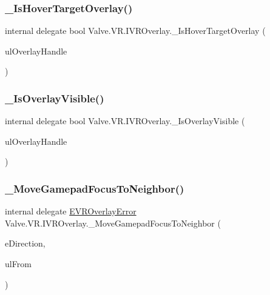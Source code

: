 \subsubsection{\texorpdfstring{\_IsHoverTargetOverlay()}{\_IsHoverTargetOverlay()}}
{\footnotesize\ttfamily internal delegate bool Valve.\+V\+R.\+I\+V\+R\+Overlay.\+\_\+\+Is\+Hover\+Target\+Overlay (\begin{DoxyParamCaption}\item[{ulong}]{ul\+Overlay\+Handle }\end{DoxyParamCaption})}

\mbox{\label{struct_valve_1_1_v_r_1_1_i_v_r_overlay_afc7823ac1ca911ba5de47113a72d3930}} 
\subsubsection{\texorpdfstring{\_IsOverlayVisible()}{\_IsOverlayVisible()}}
{\footnotesize\ttfamily internal delegate bool Valve.\+V\+R.\+I\+V\+R\+Overlay.\+\_\+\+Is\+Overlay\+Visible (\begin{DoxyParamCaption}\item[{ulong}]{ul\+Overlay\+Handle }\end{DoxyParamCaption})}

\mbox{\label{struct_valve_1_1_v_r_1_1_i_v_r_overlay_ae3ae1992c75afb63050b87c2e2c8bc48}} 
\subsubsection{\texorpdfstring{\_MoveGamepadFocusToNeighbor()}{\_MoveGamepadFocusToNeighbor()}}
{\footnotesize\ttfamily internal delegate \mbox{\hyperlink{namespace_valve_1_1_v_r_aaee5c5144f42b7969d45b854f51b0c18}{E\+V\+R\+Overlay\+Error}} Valve.\+V\+R.\+I\+V\+R\+Overlay.\+\_\+\+Move\+Gamepad\+Focus\+To\+Neighbor (\begin{DoxyParamCaption}\item[{\mbox{\hyperlink{namespace_valve_1_1_v_r_ad0398c1325c370eb3a4796d89610b868}{E\+Overlay\+Direction}}}]{e\+Direction,  }\item[{ulong}]{ul\+From }\end{DoxyParamCaption})}

